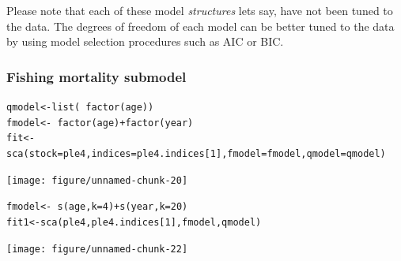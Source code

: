 \documentclass[a4paper,english,10pt]{article}\usepackage[]{graphicx}\usepackage[]{color}
\makeatletter
\newcommand{\hlnum}[1]{\textcolor[rgb]{0.2,0.2,0.2}{#1}}%
\newcommand{\hlopt}[1]{\textcolor[rgb]{0.2,0.2,0.2}{#1}}%
\newcommand{\hlstd}[1]{\textcolor[rgb]{0,0,0}{#1}}%
\newcommand{\hlkwb}[1]{\textcolor[rgb]{0.361,0.506,0.596}{#1}}%
\newcommand{\hlkwc}[1]{\textcolor[rgb]{0.361,0.506,0.596}{#1}}%
\newcommand{\hlkwd}[1]{\textcolor[rgb]{0.361,0.506,0.596}{#1}}%
\newenvironment{kframe}{%
 \def\at@end@of@kframe{}%
 \ifinner\ifhmode%
  \def\at@end@of@kframe{\end{minipage}}%
  \begin{minipage}{\columnwidth}%
 \fi\fi%
 \def\FrameCommand##1{\hskip\@totalleftmargin \hskip-\fboxsep
 \colorbox{shadecolor}{##1}\hskip-\fboxsep
     \hskip-\linewidth \hskip-\@totalleftmargin \hskip\columnwidth}%
 \MakeFramed {\advance\hsize-\width
   \@totalleftmargin\z@ \linewidth\hsize
   \@setminipage}}%
 {\par\unskip\endMakeFramed%
 \at@end@of@kframe}
\newenvironment{knitrout}{}{} %
\makeatother
\begin{document}
Please note that each of these model \emph{structures} lets say, have not been tuned to the data.  The degrees of freedom of each model can be better tuned to the data by using model selection procedures such as AIC or BIC.

\subsubsection{Fishing mortality submodel}

\begin{knitrout}
\color{fgcolor}\begin{kframe}
\begin{alltt}
\hlstd{qmodel} \hlkwb{<-} \hlkwd{list}\hlstd{(}\hlopt{~}\hlkwd{factor}\hlstd{(age))}
\hlstd{fmodel} \hlkwb{<-} \hlopt{~}\hlkwd{factor}\hlstd{(age)} \hlopt{+} \hlkwd{factor}\hlstd{(year)}
\hlstd{fit} \hlkwb{<-} \hlkwd{sca}\hlstd{(}\hlkwc{stock} \hlstd{= ple4,} \hlkwc{indices} \hlstd{= ple4.indices[}\hlnum{1}\hlstd{],} \hlkwc{fmodel} \hlstd{= fmodel,} \hlkwc{qmodel} \hlstd{= qmodel)}
\end{alltt}
\end{kframe}
\end{knitrout}


\begin{knitrout}
\color{fgcolor}

{\centering \texttt{[image: figure/unnamed-chunk-20]} 

}



\end{knitrout}


\begin{knitrout}
\color{fgcolor}\begin{kframe}
\begin{alltt}
\hlstd{fmodel} \hlkwb{<-} \hlopt{~}\hlkwd{s}\hlstd{(age,} \hlkwc{k} \hlstd{=} \hlnum{4}\hlstd{)} \hlopt{+} \hlkwd{s}\hlstd{(year,} \hlkwc{k} \hlstd{=} \hlnum{20}\hlstd{)}
\hlstd{fit1} \hlkwb{<-} \hlkwd{sca}\hlstd{(ple4, ple4.indices[}\hlnum{1}\hlstd{], fmodel, qmodel)}
\end{alltt}
\end{kframe}
\end{knitrout}


\begin{knitrout}
\color{fgcolor}

{\centering \texttt{[image: figure/unnamed-chunk-22]} 

}



\end{knitrout}
\end{document}
